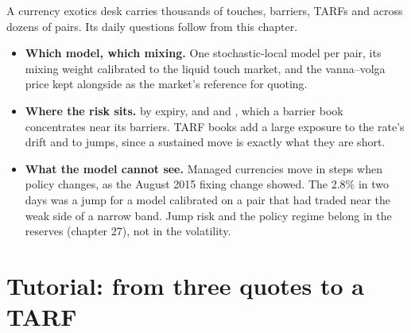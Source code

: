 A currency exotics desk carries thousands of touches, barriers, TARFs and  across dozens of pairs. Its daily questions follow
from this chapter.
\begin{itemize}
\item \textbf{Which model, which mixing.} One stochastic-local model per pair, its mixing weight calibrated to the liquid touch market, and
the vanna--volga price kept alongside as the market's reference for quoting.
\item \textbf{Where the risk sits.}  by expiry, and  and , which a barrier book concentrates near its barriers. TARF books add
a large exposure to the rate's drift and to jumps, since a sustained move is exactly what they are short.
\item \textbf{What the model cannot see.} Managed currencies move in steps when policy changes, as the August 2015 fixing change showed.
The 2.8\% in two days was a jump for a model calibrated on a pair that had traded near the weak side of a narrow band. Jump risk and the
policy regime belong in the reserves (chapter 27), not in the volatility.
\end{itemize}

\section{Tutorial: from three quotes to a TARF}\label{tut:dv:fx-derivatives:tut}

